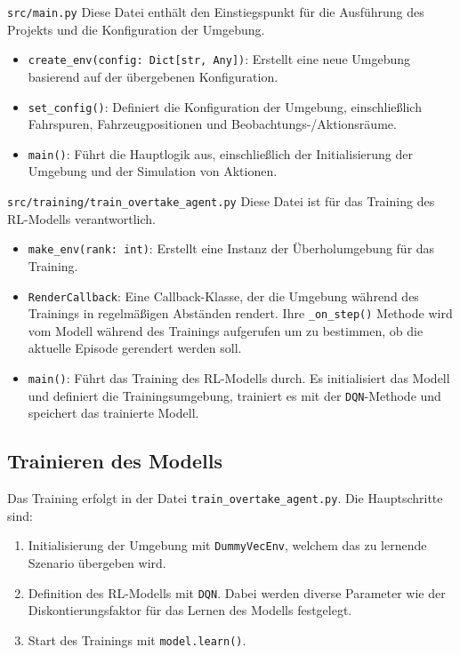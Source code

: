 \texttt{src/main.py}
Diese Datei enthält den Einstiegspunkt für die Ausführung des Projekts und die Konfiguration der Umgebung.

\begin{itemize}
    \item \texttt{create\_env(config: Dict[str, Any])}: Erstellt eine neue Umgebung basierend auf der übergebenen Konfiguration.
    \item \texttt{set\_config()}: Definiert die Konfiguration der Umgebung, einschließlich Fahrspuren, Fahrzeugpositionen und Beobachtungs-/Aktionsräume.
    \item \texttt{main()}: Führt die Hauptlogik aus, einschließlich der Initialisierung der Umgebung und der Simulation von Aktionen.
\end{itemize}

\texttt{src/training/train\_overtake\_agent.py}
Diese Datei ist für das Training des RL-Modells verantwortlich.

\begin{itemize}
    \item \texttt{make\_env(rank: int)}: Erstellt eine Instanz der Überholumgebung für das Training.
    \item \texttt{RenderCallback}: Eine Callback-Klasse, der die Umgebung während des Trainings in regelmäßigen Abständen rendert. Ihre \texttt{\_on\_step()} Methode wird vom Modell während des Trainings aufgerufen um zu bestimmen, ob die aktuelle Episode gerendert werden soll.
    \item \texttt{main()}: Führt das Training des RL-Modells durch. Es initialisiert das Modell und definiert die Trainingsumgebung, trainiert es mit der \texttt{DQN}-Methode und speichert das trainierte Modell.
\end{itemize}

\subsection{Trainieren des Modells}
Das Training erfolgt in der Datei \texttt{train\_overtake\_agent.py}. Die Hauptschritte sind:
\begin{enumerate}
    \item Initialisierung der Umgebung mit \texttt{DummyVecEnv}, welchem das zu lernende Szenario übergeben wird.
    \item Definition des RL-Modells mit \texttt{DQN}. Dabei werden diverse Parameter wie der Diskontierungsfaktor für das Lernen des Modells festgelegt.
    \item Start des Trainings mit \texttt{model.learn()}.
\end{enumerate}

